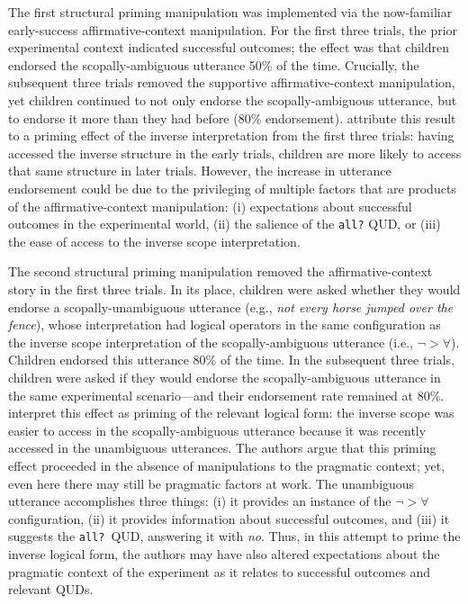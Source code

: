 \documentclass[cm]{glossa}
\begin{document}
The first structural priming manipulation was implemented via the now-familiar early-success affirmative-context manipulation. For the first three trials, the  prior experimental context indicated successful outcomes; the effect was that children endorsed the scopally-ambiguous utterance 50\% of the time. Crucially, the subsequent three trials removed the supportive affirmative-context manipulation, yet children continued to not only endorse the scopally-ambiguous utterance, but to endorse it more than they had before (80\% endorsement). \cite{viauetal2010} attribute this result to a priming effect of the inverse interpretation from the first three trials: having accessed the inverse structure in the early trials, children are more likely to access that same structure in later trials. However, the increase in utterance endorsement could be due to the privileging of multiple  factors that are products of the affirmative-context manipulation: (i) expectations about successful outcomes in the experimental world, (ii)  the salience of the \texttt{all?} QUD, or (iii)  the ease of access to the inverse scope interpretation. 

The second structural priming manipulation removed the affirmative-context story in the first three trials. In its place, children were asked whether they would endorse a scopally-unambiguous utterance (e.g., \textit{not every horse jumped over the fence}), whose interpretation had logical operators in the same configuration as the inverse scope interpretation of the scopally-ambiguous utterance (i.e., $\neg>\forall$). Children endorsed this utterance 80\% of the time. In the subsequent three trials, children were asked if they would endorse the scopally-ambiguous utterance in the same experimental scenario---and their endorsement rate remained at 80\%. \cite{viauetal2010} interpret this effect as priming of the relevant logical form: the inverse scope was easier to access in the scopally-ambiguous utterance because it was recently accessed in the unambiguous utterances. The authors argue that this priming effect proceeded in the absence of manipulations to the pragmatic context; yet, even here there may still be pragmatic factors at work. The unambiguous utterance accomplishes three things: (i) it provides an instance of the $\neg>\forall$ configuration, (ii) it provides information about successful outcomes, and (iii) it suggests the \texttt{all?}~QUD, answering it with \emph{no}. Thus, in this attempt to prime the inverse logical form, the authors may have also altered expectations about the pragmatic context of the experiment as it relates to successful outcomes and relevant QUDs.
\end{document}
